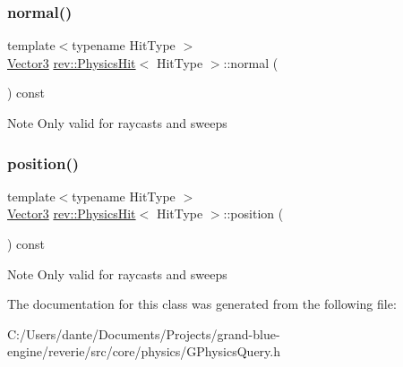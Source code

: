 \subsubsection{\texorpdfstring{normal()}{normal()}}
{\footnotesize\ttfamily template$<$typename Hit\+Type $>$ \\
\mbox{\hyperlink{classrev_1_1_vector}{Vector3}} \mbox{\hyperlink{classrev_1_1_physics_hit}{rev\+::\+Physics\+Hit}}$<$ Hit\+Type $>$\+::normal (\begin{DoxyParamCaption}{ }\end{DoxyParamCaption}) const\hspace{0.3cm}{\ttfamily [inline]}}

\begin{DoxyNote}{Note}
Only valid for raycasts and sweeps 
\end{DoxyNote}
\mbox{\label{classrev_1_1_physics_hit_a8f76cef390749e030ba96acb1f85d6fd}} 
\subsubsection{\texorpdfstring{position()}{position()}}
{\footnotesize\ttfamily template$<$typename Hit\+Type $>$ \\
\mbox{\hyperlink{classrev_1_1_vector}{Vector3}} \mbox{\hyperlink{classrev_1_1_physics_hit}{rev\+::\+Physics\+Hit}}$<$ Hit\+Type $>$\+::position (\begin{DoxyParamCaption}{ }\end{DoxyParamCaption}) const\hspace{0.3cm}{\ttfamily [inline]}}

\begin{DoxyNote}{Note}
Only valid for raycasts and sweeps 
\end{DoxyNote}


The documentation for this class was generated from the following file\+:\begin{DoxyCompactItemize}
\item 
C\+:/\+Users/dante/\+Documents/\+Projects/grand-\/blue-\/engine/reverie/src/core/physics/G\+Physics\+Query.\+h\end{DoxyCompactItemize}
